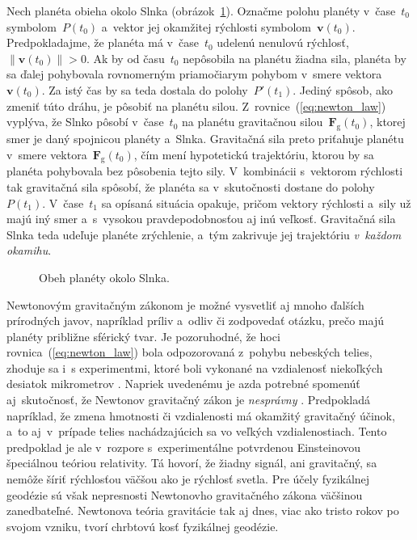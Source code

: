 \documentclass[a4paper, 12pt]{book}
\newcommand{\gidx}{\mathrm g}
\let\vec\mathbf
\begin{document}
Nech planéta obieha okolo Slnka (obrázok~\ref{fig:orbital_motion}).  Označme 
polohu planéty v~čase~$t_0$ symbolom~$P(t_0)$ a~vektor jej okamžitej rýchlosti 
symbolom~$\vec v(t_0)$.  Predpokladajme, že planéta má v~čase~$t_0$ udelenú 
nenulovú rýchlosť, $\| \vec v(t_0) \| > 0$.  Ak by od času~$t_0$ nepôsobila na 
planétu žiadna sila, planéta by sa ďalej pohybovala rovnomerným priamočiarym 
pohybom v~smere vektora~$\vec v(t_0)$.  Za istý čas by sa teda dostala do 
polohy~$P'(t_1)$.  Jediný spôsob, ako zmeniť túto dráhu, je pôsobiť na planétu 
silou.  Z~rovnice~(\ref{eq:newton_law}) vyplýva, že Slnko pôsobí v~čase~$t_0$ 
na planétu gravitačnou silou~$\vec F_\gidx(t_0)$, ktorej smer je daný spojnicou 
planéty a~Slnka.  Gravitačná sila preto priťahuje planétu v~smere vektora~$\vec 
F_\gidx(t_0)$, čím mení hypotetickú trajektóriu, ktorou by sa planéta 
pohybovala bez pôsobenia tejto sily.  V~kombinácii s~vektorom rýchlosti tak 
gravitačná sila spôsobí, že planéta sa v~skutočnosti dostane do 
polohy~$P(t_1)$.  V~čase~$t_1$ sa opísaná situácia opakuje, pričom vektory 
rýchlosti a~sily už majú iný smer a~s~vysokou pravdepodobnosťou aj inú veľkosť.  
Gravitačná sila Slnka teda udeľuje planéte zrýchlenie, a~tým zakrivuje jej 
trajektóriu \emph{v~každom okamihu}.

\begin{figure}
\centering

\caption{Obeh planéty okolo Slnka.}
\label{fig:orbital_motion}
\end{figure}

Newtonovým gravitačným zákonom je možné vysvetliť aj mnoho ďalších prírodných 
javov, napríklad príliv a~odliv či zodpovedať otázku, prečo majú planéty 
približne sférický tvar.  Je pozoruhodné, že hoci rovnica~(\ref{eq:newton_law}) 
bola odpozorovaná z~pohybu nebeských telies, zhoduje sa i~s experimentmi, ktoré 
boli vykonané na vzdialenosť niekoľkých desiatok mikrometrov 
\parencite{Lee2020}.  Napriek uvedenému je azda potrebné spomenúť 
aj~skutočnosť, že Newtonov gravitačný zákon je \emph{nesprávny} 
\parencite{Feynman}.  Predpokladá napríklad, že zmena hmotnosti či vzdialenosti 
má okamžitý gravitačný účinok, a~to aj~v~prípade telies nachádzajúcich sa vo 
veľkých vzdialenostiach.  Tento predpoklad je ale v~rozpore s~experimentálne 
potvrdenou Einsteinovou špeciálnou teóriou relativity.  Tá hovorí, že žiadny 
signál, ani gravitačný, sa nemôže šíriť rýchlosťou väčšou ako je rýchlosť 
svetla.  Pre účely fyzikálnej geodézie sú však nepresnosti Newtonovho 
gravitačného zákona väčšinou zanedbateľné.  Newtonova teória gravitácie tak aj 
dnes, viac ako tristo rokov po svojom vzniku, tvorí chrbtovú kosť fyzikálnej 
geodézie.
\end{document}
